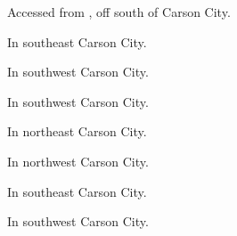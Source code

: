 

\begin{LocationList}

Accessed from , off  south of Carson City.

\Location{\GarageHQ \Garage}
In southeast Carson City.

\Location{\GasStation \Gas}
In southwest Carson City.

In southwest Carson City.

\Location{\RecruitmentAgency \Recruitment}
In northeast Carson City.

In northwest Carson City.

In southeast Carson City.

\Location{\TruckService \Rest \Service}
In southwest Carson City.

\end{LocationList}

